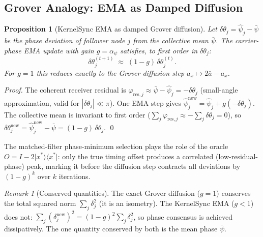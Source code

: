 \documentclass[12pt,a4paper]{article}
\theoremstyle{plain}
\newtheorem{proposition}[theorem]{Proposition}
\theoremstyle{definition}
\theoremstyle{remark}
\newtheorem{remark}[theorem]{Remark}
\newcommand{\ket}[1]{\lvert #1 \rangle}
\newcommand{\bra}[1]{\langle #1 \rvert}
\begin{document}
\subsection{Grover Analogy: EMA as Damped Diffusion}

\begin{proposition}[KernelSync EMA as damped Grover diffusion]%
  \label{prop:ks-grover}
  Let $\delta\theta_j = \hat\psi_j - \bar\psi$ be the phase deviation of
  follower node $j$ from the collective mean $\bar\psi$.  The carrier-phase
  EMA update with gain $g = \alpha_\psi$ satisfies, to first order in
  $\delta\theta_j$:
  \begin{equation}
    \delta\theta_j^{(t+1)} \;\approx\; (1-g)\,\delta\theta_j^{(t)}.
    \label{eq:ks-ema}
  \end{equation}
  For $g = 1$ this reduces exactly to the Grover diffusion step
  $a_x \mapsto 2\bar{a} - a_x$.
\end{proposition}

\begin{proof}
  The coherent receiver residual is
  $\varphi_{\mathrm{res},j} \approx \bar\psi - \hat\psi_j = -\delta\theta_j$
  (small-angle approximation, valid for $|\delta\theta_j| \ll \pi$).
  One EMA step gives
  $\hat\psi_j^{\mathrm{new}} = \hat\psi_j + g(-\delta\theta_j)$.
  The collective mean is invariant to first order
  ($\sum_j \varphi_{\mathrm{res},j} \approx -\sum_j \delta\theta_j = 0$),
  so
  $\delta\theta_j^{\mathrm{new}}
   = \hat\psi_j^{\mathrm{new}} - \bar\psi = (1-g)\,\delta\theta_j$. \qed
\end{proof}

\noindent The matched-filter phase-minimum selection plays the role of the
oracle $O = I - 2\ket{x^*}\bra{x^*}$: only the true timing offset produces a
correlated (low-residual-phase) peak, marking it before the diffusion step
contracts all deviations by $(1-g)^k$ over $k$ iterations.

\begin{remark}[Conserved quantities]
  The exact Grover diffusion ($g=1$) conserves the total squared norm
  $\sum_j\delta_j^2$ (it is an isometry).  The KernelSync EMA ($g<1$) does
  not: $\sum_j(\delta_j^{\mathrm{new}})^2 = (1-g)^2\sum_j\delta_j^2$, so
  phase consensus is achieved dissipatively.  The one quantity conserved by
  both is the mean phase $\bar\psi$.
\end{remark}

\end{document}
